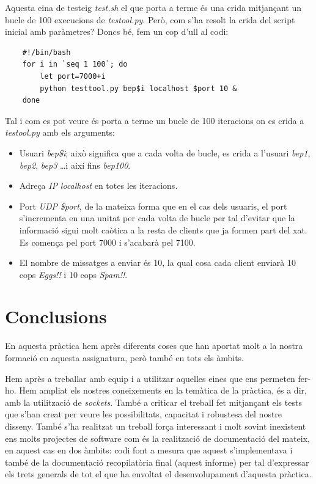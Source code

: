 \documentclass[a4paper,10pt]{article}
\begin{document}
	Aquesta eina de testeig \emph{test.sh} el que porta a terme és una crida mitjançant un bucle de 100 execucions de \emph{testool.py}. Però, com s'ha resolt la crida del script inicial amb paràmetres? Doncs bé, fem un cop d'ull al codi:
	\begin{verbatim}
	#!/bin/bash
	for i in `seq 1 100`; do
	    let port=7000+i
	    python testtool.py bep$i localhost $port 10 &
	done
	\end{verbatim}
	Tal i com es pot veure és porta a terme un bucle de 100 iteracions on es crida a \emph{testool.py} amb els arguments:
		\begin{itemize}
		\item Usuari \emph{bep\$i}; això significa que a cada volta de bucle, es crida a l'usuari \emph{bep1}, \emph{bep2}, \emph{bep3} \ldots i així fins \emph{bep100}.
		\item Adreça \emph{IP}  \emph{localhost} en totes les iteracions.
		\item Port \emph{UDP} \emph{\$port}, de la mateixa forma que en el cas dels usuaris, el port s'incrementa en una unitat per cada volta de bucle per tal d'evitar que la informació sigui molt caòtica a la resta de clients que ja formen part del xat. Es comença pel port 7000 i s'acabarà pel 7100.
		\item El nombre de missatges a enviar és 10, la qual cosa cada client enviarà 10 cops \emph{Eggs!!} i 10 cops \emph{Spam!!}.
		\end{itemize}

\pagebreak
\section{Conclusions}
En aquesta pràctica hem après diferents coses que han aportat molt a la nostra formació en aquesta assignatura, però també en tots els àmbits. 

Hem après a treballar amb equip i a utilitzar aquelles eines que ens permeten fer-ho. Hem ampliat els nostres coneixements en la temàtica de la pràctica, és a dir, amb la utilització de \emph{sockets}. També a criticar el treball fet mitjançant els tests que s'han creat per veure les possibilitats, capacitat i robustesa del nostre disseny. També s'ha realitzat un treball força interessant i molt sovint inexistent ens molts projectes de software com és la realització de documentació del mateix, en aquest cas en dos àmbits: codi font a mesura que aquest s'implementava i també de la documentació recopilatòria final (aquest informe) per tal d'expressar els trets generals de tot el que ha envoltat el desenvolupament d'aquesta pràctica.
\end{document}
